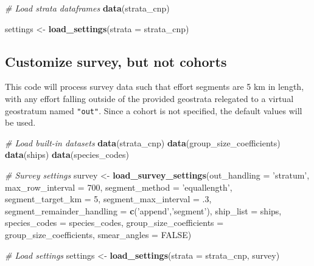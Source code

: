 \documentclass[
]{book}
\newenvironment{Shaded}{\begin{snugshade}}{\end{snugshade}}
\newcommand{\CommentTok}[1]{\textcolor[rgb]{0.56,0.35,0.01}{\textit{#1}}}
\newcommand{\DataTypeTok}[1]{\textcolor[rgb]{0.13,0.29,0.53}{#1}}
\newcommand{\DecValTok}[1]{\textcolor[rgb]{0.00,0.00,0.81}{#1}}
\newcommand{\FloatTok}[1]{\textcolor[rgb]{0.00,0.00,0.81}{#1}}
\newcommand{\KeywordTok}[1]{\textcolor[rgb]{0.13,0.29,0.53}{\textbf{#1}}}
\newcommand{\NormalTok}[1]{#1}
\newcommand{\OtherTok}[1]{\textcolor[rgb]{0.56,0.35,0.01}{#1}}
\newcommand{\StringTok}[1]{\textcolor[rgb]{0.31,0.60,0.02}{#1}}
\begin{document}
\begin{Shaded}
\begin{Highlighting}[]
\CommentTok{# Load strata dataframes}
\KeywordTok{data}\NormalTok{(strata_cnp)}

\NormalTok{settings <-}\StringTok{ }\KeywordTok{load_settings}\NormalTok{(}\DataTypeTok{strata =}\NormalTok{ strata_cnp)}
\end{Highlighting}
\end{Shaded}

\hypertarget{customize-survey-but-not-cohorts}{%
\subsection*{Customize survey, but not cohorts}\label{customize-survey-but-not-cohorts}}

This code will process survey data such that effort segments are 5 km in length, with any effort falling outside of the provided geostrata relegated to a virtual geostratum named \texttt{"out"}. Since a cohort is not specified, the default values will be used.

\begin{Shaded}
\begin{Highlighting}[]
\CommentTok{# Load built-in datasets}
\KeywordTok{data}\NormalTok{(strata_cnp)}
\KeywordTok{data}\NormalTok{(group_size_coefficients)}
\KeywordTok{data}\NormalTok{(ships)}
\KeywordTok{data}\NormalTok{(species_codes)}

\CommentTok{# Survey settings}
\NormalTok{survey <-}\StringTok{ }
\StringTok{  }\KeywordTok{load_survey_settings}\NormalTok{(}\DataTypeTok{out_handling =} \StringTok{'stratum'}\NormalTok{,}
                       \DataTypeTok{max_row_interval =} \DecValTok{700}\NormalTok{,}
                       \DataTypeTok{segment_method =} \StringTok{'equallength'}\NormalTok{,}
                       \DataTypeTok{segment_target_km =} \DecValTok{5}\NormalTok{,}
                       \DataTypeTok{segment_max_interval =} \FloatTok{.3}\NormalTok{,}
                       \DataTypeTok{segment_remainder_handling =} \KeywordTok{c}\NormalTok{(}\StringTok{'append'}\NormalTok{,}\StringTok{'segment'}\NormalTok{),}
                       \DataTypeTok{ship_list =}\NormalTok{ ships,}
                       \DataTypeTok{species_codes =}\NormalTok{ species_codes,}
                       \DataTypeTok{group_size_coefficients =}\NormalTok{ group_size_coefficients,}
                       \DataTypeTok{smear_angles =} \OtherTok{FALSE}\NormalTok{)}

\CommentTok{# Load settings}
\NormalTok{settings <-}\StringTok{ }\KeywordTok{load_settings}\NormalTok{(}\DataTypeTok{strata =}\NormalTok{ strata_cnp,}
\NormalTok{                          survey)}
\end{Highlighting}
\end{Shaded}
\end{document}
